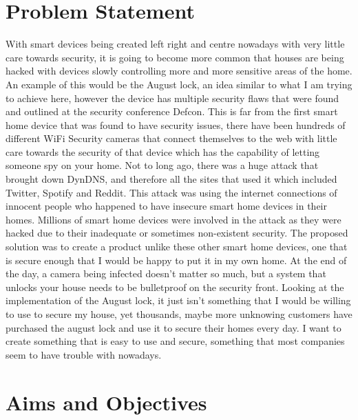 \section{Problem Statement}
With smart devices being created left right and centre nowadays with very little care towards security, it is going to become more common that houses are being hacked with devices slowly controlling more and more sensitive areas of the home. An example of this would be the August lock, an idea similar to what I am trying to achieve here, however the device has multiple security flaws that were found and outlined at the security conference Defcon. This is far from the first smart home device that was found to have security issues, there have been hundreds of different WiFi Security cameras that connect themselves to the web with little care towards the security of that device which has the capability of letting someone spy on your home. Not to long ago, there was a huge attack that brought down DynDNS, and therefore all the sites that used it which included Twitter, Spotify and Reddit.  This attack was using the internet connections of innocent people who happened to have insecure smart home devices in their homes. Millions of smart home devices were involved in the attack as they were hacked due to their inadequate or sometimes non-existent security.
\newline
\newline
The proposed solution was to create a product unlike these other smart home devices, one that is secure enough that I would be happy to put it in my own home. At the end of the day, a camera being infected doesn't matter so much, but a system that unlocks your house needs to be bulletproof on the security front. Looking at the implementation of the August lock, it just isn't something that I would be willing to use to secure my house, yet thousands, maybe more unknowing customers have purchased the august lock and use it to secure their homes every day. I want to create something that is easy to use and secure, something that most companies seem to have trouble with nowadays.

\section{Aims and Objectives}

